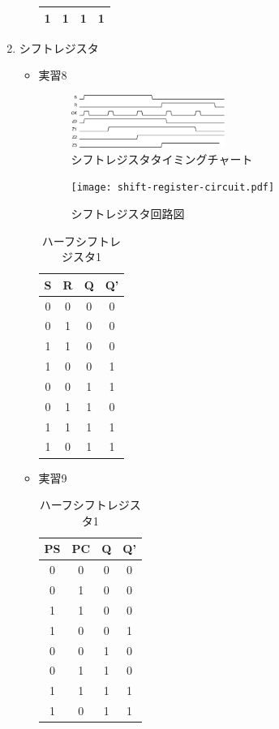 \documentclass[dvipdfmx]{jsarticle}
\begin{document}
\begin{enumerate}
\begin{itemize}
\begin{table}[H]
\begin{tabular}{|c|c|c|c|}
								1 & 1 & 1 & 1 \\ \hline
							\end{tabular}
						\end{table}
				\end{itemize}
			\item シフトレジスタ
				\begin{itemize}
					\item 実習8
						\begin{figure}[H]
							\center
							\includegraphics[width=5cm]{shift.eps}
							\caption{シフトレジスタタイミングチャート}
						\end{figure}
						\begin{figure}[H]
							\center
							\texttt{[image: shift-register-circuit.pdf]}
							\caption{シフトレジスタ回路図}
						\end{figure}
						\begin{table}[H]
							\center
							\caption{ハーフシフトレジスタ1}
							\begin{tabular}{|c|c|c|c|}
								\hline
								S & R & Q & Q'\\ \hline
								0 & 0 & 0 & 0 \\ \hline
								0 & 1 & 0 & 0 \\ \hline
								1 & 1 & 0 & 0 \\ \hline
								1 & 0 & 0 & 1 \\ \hline
								0 & 0 & 1 & 1 \\ \hline
								0 & 1 & 1 & 0 \\ \hline
								1 & 1 & 1 & 1 \\ \hline
								1 & 0 & 1 & 1 \\ \hline
							\end{tabular}
						\end{table}
					\item 実習9
						\begin{table}[H]
							\center
							\caption{ハーフシフトレジスタ1}
							\begin{tabular}{|c|c|c|c|}
								\hline
								PS & PC & Q & Q'\\ \hline
								0 & 0 & 0 & 0 \\ \hline
								0 & 1 & 0 & 0 \\ \hline
								1 & 1 & 0 & 0 \\ \hline
								1 & 0 & 0 & 1 \\ \hline
								0 & 0 & 1 & 0 \\ \hline
								0 & 1 & 1 & 0 \\ \hline
								1 & 1 & 1 & 1 \\ \hline
								1 & 0 & 1 & 1 \\ \hline
							\end{tabular}
						\end{table}
				\end{itemize}
		\end{enumerate}
\end{document}
